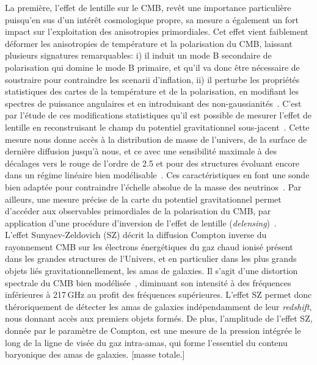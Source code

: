 La première, l'effet de lentille sur le CMB, revêt une importance
particulière puisqu'en sus d'un intérêt cosmologique propre, sa mesure
a également un fort impact sur l'exploitation des anisotropies
primordiales. Cet effet vient faiblement déformer les anisotropies de
température et la polarisation du CMB, laissant plusieurs signatures
remarquables: i) il induit un mode B secondaire de polarisation qui
domine le mode B primaire, et qu'il va donc être nécessaire de
soustraire pour contraindre les scenarii d'inflation, ii) il perturbe
les propriétés statistiques des cartes de la température et de la
polarisation, en modifiant les spectres de puissance angulaires et en
introduisant des non-gaussianités~. C'est par l'étude de ces
modifications statistiques qu'il est possible de mesurer l'effet de
lentille en reconstruisant le champ du potentiel gravitationnel
sous-jacent~. Cette mesure nous donne accès à la distribution de masse
de l'univers, de la surface de dernière diffusion jusqu'à nous, et ce
avec une sensibilité maximale à des décalages vers le rouge de l'ordre
de 2.5 et pour des structures évoluant encore dans un régime linéaire bien
modélisable~. Ces caractéristiques en font une sonde bien adaptée pour
contraindre l'échelle absolue de la masse des
neutrinos~. Par ailleurs, une mesure précise de
la carte du potentiel gravitationnel permet d'accéder aux observables
primordiales de la polarisation du CMB, par application d'une
procédure d'inversion de l'effet de lentille (\emph{delensing})~.\\


L'effet Sunyaev-Zeldovich (SZ) décrit la diffusion Compton inverse du
rayonnement CMB sur les électrons énergétiques du gaz chaud ionisé
présent dans les grandes structures de l'Univers, et en particulier
dans les plus grands objets liés gravitationnellement, les amas de
galaxies. Il s'agit d'une distortion spectrale du CMB bien
modélisée~, diminuant son intensité à
des fréquences inférieures à 217\,GHz au profit des fréquences
supérieures. L'effet SZ permet donc théroriquement de détecter les
amas de galaxies indépendamment de leur \emph{redshift}, nous donnant
accès aux premiers objets formés. De plus, l'amplitude de l'effet SZ,
donnée par le paramètre de Compton, est une mesure de la pression
intégrée le long de la ligne de visée du gaz intra-amas, qui forme
l'essentiel du contenu baryonique des amas de galaxies. 
[masse totale.] 


